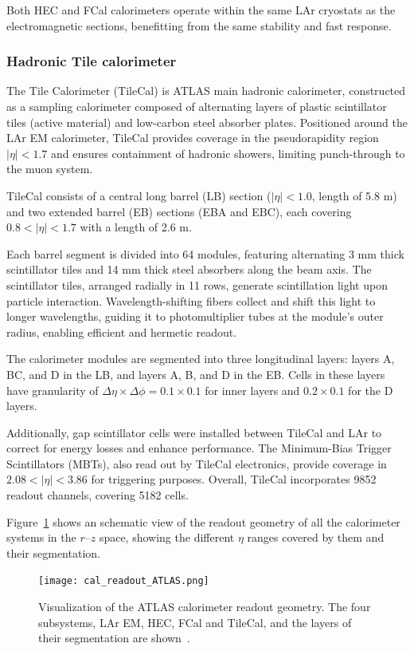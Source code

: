 Both HEC and FCal calorimeters operate within the same LAr cryostats as the electromagnetic sections, benefitting from the same stability and fast response. 

\subsubsection{Hadronic Tile calorimeter}
\label{sec:tilecal}

The Tile Calorimeter (TileCal) is ATLAS main hadronic calorimeter, constructed as a sampling calorimeter composed of alternating layers of plastic scintillator tiles (active material) and low-carbon steel absorber plates. Positioned around the LAr EM calorimeter, TileCal provides coverage in the pseudorapidity region $|\eta|<1.7$ and ensures containment of hadronic showers, limiting punch-through to the muon system.

TileCal consists of a central long barrel (LB) section ($|\eta|<1.0$, length of 5.8 m) and two extended barrel (EB) sections (EBA and EBC), each covering $0.8<|\eta|<1.7$ with a length of 2.6 m.

Each barrel segment is divided into 64 modules, featuring alternating 3 mm thick scintillator tiles and 14 mm thick steel absorbers along the beam axis. The scintillator tiles, arranged radially in 11 rows, generate scintillation light upon particle interaction. Wavelength-shifting fibers collect and shift this light to longer wavelengths, guiding it to photomultiplier tubes at the module's outer radius, enabling efficient and hermetic readout.

The calorimeter modules are segmented into three longitudinal layers: layers A, BC, and D in the LB, and layers A, B, and D in the EB. Cells in these layers have granularity of $\Delta\eta \times \Delta\phi=0.1\times0.1$ for inner layers and $0.2\times0.1$ for the D layers.

Additionally, gap scintillator cells were installed between TileCal and LAr to correct for energy losses and enhance performance. The Minimum-Bias Trigger Scintillators (MBTs), also read out by TileCal electronics, provide coverage in $2.08<|\eta|<3.86$ for triggering purposes. Overall, TileCal incorporates 9852 readout channels, covering 5182 cells.

Figure~\ref{fig:cal_resum} shows an schematic view of the readout geometry of all the calorimeter systems in the $r$--$z$ space, showing the different $\eta$ ranges covered by them and their segmentation.
\begin{figure}[htbp]
    \centering
        \texttt{[image: cal\_readout\_ATLAS.png]}
    \caption{Visualization of the ATLAS calorimeter readout geometry. The four subsystems, LAr EM, HEC, FCal and TileCal, and the layers of their segmentation are shown~\cite{Gessinger:2752944}.}
    \label{fig:cal_resum}
\end{figure}

